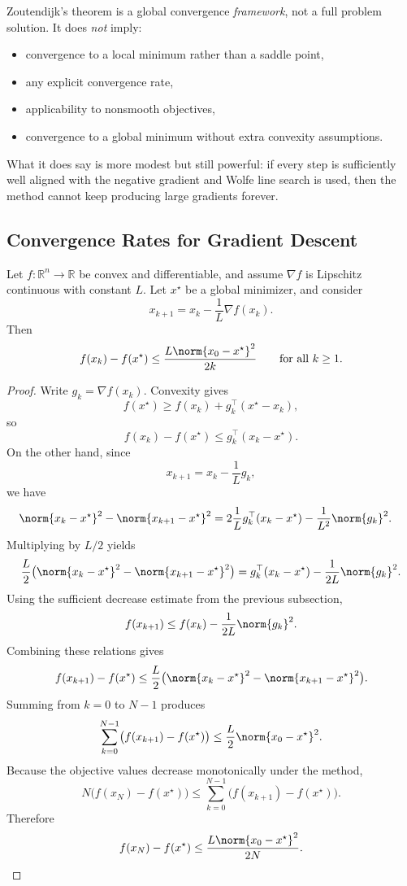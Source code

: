\begin{remark}
	Zoutendijk's theorem is a global convergence \emph{framework}, not a full problem solution. It does \emph{not} imply:
	\begin{itemize}
		\item convergence to a local minimum rather than a saddle point,
		\item any explicit convergence rate,
		\item applicability to nonsmooth objectives,
		\item convergence to a global minimum without extra convexity assumptions.
	\end{itemize}
	What it does say is more modest but still powerful: if every step is sufficiently well aligned with the negative gradient and Wolfe line search is used, then the method cannot keep producing large gradients forever.
\end{remark}

\subsection{Convergence Rates for Gradient Descent}
\label{sec:l2-convergence-rates-for-gradient-descent}

\begin{theorem}\label{thm:l2-sublinear-rate-for-smooth-convex-functions}
	Let $f:\mathbb{R}^n \to \mathbb{R}$ be convex and differentiable, and assume $\nabla f$ is Lipschitz continuous with constant $L$. Let $x^\star$ be a global minimizer, and consider
	\[
		x_{k+1}=x_k-\frac{1}{L}\nabla f(x_k).
	\]
	Then
	\[
		f(x_k)-f(x^\star)
		\le
		\frac{L\norm{x_0-x^\star}^2}{2k}
		\qquad \text{for all } k \ge 1.
	\]
\end{theorem}
\begin{proof}
	Write $g_k=\nabla f(x_k)$. Convexity gives
	\[
		f(x^\star)\ge f(x_k)+g_k^\top(x^\star-x_k),
	\]
	so
	\[
		f(x_k)-f(x^\star)\le g_k^\top(x_k-x^\star).
	\]
	On the other hand, since
	\[
		x_{k+1}=x_k-\frac{1}{L}g_k,
	\]
	we have
	\begin{align*}
		\norm{x_k-x^\star}^2-\norm{x_{k+1}-x^\star}^2
		 & =
		2\frac{1}{L}g_k^\top(x_k-x^\star)-\frac{1}{L^2}\norm{g_k}^2.
	\end{align*}
	Multiplying by $L/2$ yields
	\[
		\frac{L}{2}\bigl(\norm{x_k-x^\star}^2-\norm{x_{k+1}-x^\star}^2\bigr)
		=
		g_k^\top(x_k-x^\star)-\frac{1}{2L}\norm{g_k}^2.
	\]
	Using the sufficient decrease estimate from the previous subsection,
	\[
		f(x_{k+1}) \le f(x_k)-\frac{1}{2L}\norm{g_k}^2.
	\]
	Combining these relations gives
	\[
		f(x_{k+1})-f(x^\star)
		\le
		\frac{L}{2}\bigl(\norm{x_k-x^\star}^2-\norm{x_{k+1}-x^\star}^2\bigr).
	\]
	Summing from $k=0$ to $N-1$ produces
	\[
		\sum_{k=0}^{N-1}\bigl(f(x_{k+1})-f(x^\star)\bigr)
		\le
		\frac{L}{2}\norm{x_0-x^\star}^2.
	\]
	Because the objective values decrease monotonically under the method,
	\[
		N\bigl(f(x_N)-f(x^\star)\bigr)
		\le
		\sum_{k=0}^{N-1}\bigl(f(x_{k+1})-f(x^\star)\bigr).
	\]
	Therefore
	\[
		f(x_N)-f(x^\star)
		\le
		\frac{L\norm{x_0-x^\star}^2}{2N}.
	\]
\end{proof}

